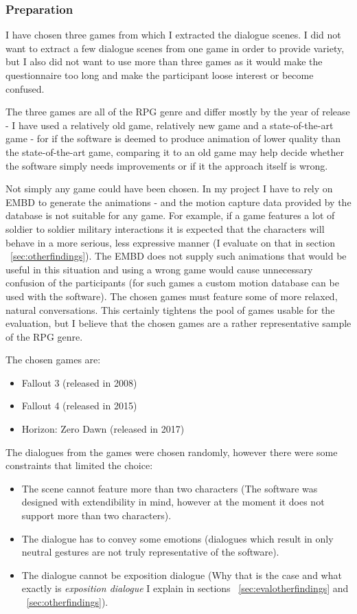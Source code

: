 \medskip
\subsubsection{Preparation}
I have chosen three games from which I extracted the dialogue scenes. I did not want to extract a few dialogue scenes from one game in order to provide variety, but I also did not want to use more than three games as it would make the questionnaire too long and make the participant loose interest or become confused.

The three games are all of the RPG genre and differ mostly by the year of release - I have used a relatively old game, relatively new game and a state-of-the-art game - for if the software is deemed to produce animation of lower quality than the state-of-the-art game, comparing it to an old game may help decide whether the software simply needs improvements or if it the approach itself is wrong.

Not simply any game could have been chosen. In my project I have to rely on EMBD to generate the animations - and the motion capture data provided by the database is not suitable for any game. For example, if a game features a lot of soldier to soldier military interactions it is expected that the characters will behave in a more serious, less expressive manner (I evaluate on that in section ~\ref{sec:otherfindings}). The EMBD does not supply such animations that would be useful in this situation and using a wrong game would cause unnecessary confusion of the participants (for such games a custom motion database can be used with the software). The chosen games must feature some of more relaxed, natural conversations. This certainly tightens the pool of games usable for the evaluation, but I believe that the chosen games are a rather representative sample of the RPG genre.

The chosen games are:
\begin{itemize}
	\item Fallout 3 (released in 2008)
	\item Fallout 4 (released in 2015)
	\item Horizon: Zero Dawn (released in 2017)
\end{itemize}

The dialogues from the games were chosen randomly, however there were some constraints that limited the choice:
\begin{itemize}
	\item The scene cannot feature more than two characters (The software was designed with extendibility in mind, however at the moment it does not support more than two characters).
	\item The dialogue has to convey some emotions (dialogues which result in only neutral gestures are not truly representative of the software).
	\item The dialogue cannot be exposition dialogue (Why that is the case and what exactly is \textit{exposition dialogue} I explain in sections ~\ref{sec:evalotherfindings} and ~\ref{sec:otherfindings}).
\end{itemize}

